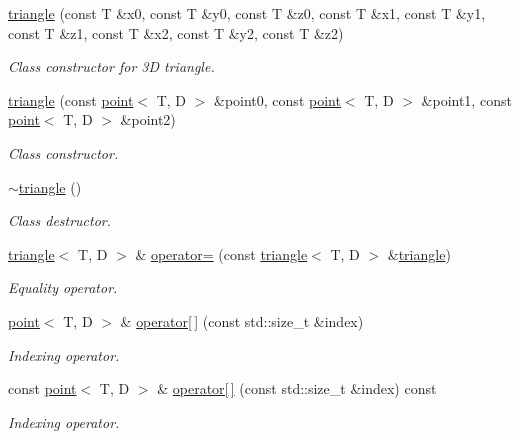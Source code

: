 \begin{DoxyCompactItemize}
\hyperlink{classacme_1_1triangle_a78a146aacb55247cc900edcb883422a5}{triangle} (const T \&x0, const T \&y0, const T \&z0, const T \&x1, const T \&y1, const T \&z1, const T \&x2, const T \&y2, const T \&z2)
\begin{DoxyCompactList}\small\item\em Class constructor for 3D triangle. \end{DoxyCompactList}\item 
\hyperlink{classacme_1_1triangle_a53f6b787605b71b5420ce6524acfecfd}{triangle} (const \hyperlink{classacme_1_1point}{point}$<$ T, D $>$ \&point0, const \hyperlink{classacme_1_1point}{point}$<$ T, D $>$ \&point1, const \hyperlink{classacme_1_1point}{point}$<$ T, D $>$ \&point2)
\begin{DoxyCompactList}\small\item\em Class constructor. \end{DoxyCompactList}\item 
\mbox{\label{classacme_1_1triangle_a320a1aa56691e462b20f9279a68fb5ac}} 
\hyperlink{classacme_1_1triangle_a320a1aa56691e462b20f9279a68fb5ac}{$\sim$triangle} ()
\begin{DoxyCompactList}\small\item\em Class destructor. \end{DoxyCompactList}\item 
\hyperlink{classacme_1_1triangle}{triangle}$<$ T, D $>$ \& \hyperlink{classacme_1_1triangle_a1cd1501699f14ff706121b8dfeaf1947}{operator=} (const \hyperlink{classacme_1_1triangle}{triangle}$<$ T, D $>$ \&\hyperlink{classacme_1_1triangle}{triangle})
\begin{DoxyCompactList}\small\item\em Equality operator. \end{DoxyCompactList}\item 
\hyperlink{classacme_1_1point}{point}$<$ T, D $>$ \& \hyperlink{classacme_1_1triangle_a6b6fabe34b7ce84ab4693bc61762f212}{operator\mbox{[}$\,$\mbox{]}} (const std\+::size\+\_\+t \&index)
\begin{DoxyCompactList}\small\item\em Indexing operator. \end{DoxyCompactList}\item 
const \hyperlink{classacme_1_1point}{point}$<$ T, D $>$ \& \hyperlink{classacme_1_1triangle_a6a3ec6159ea5b0342444fc9c735c09ed}{operator\mbox{[}$\,$\mbox{]}} (const std\+::size\+\_\+t \&index) const
\begin{DoxyCompactList}\small\item\em Indexing operator. \end{DoxyCompactList}\item 

\end{DoxyCompactItemize}
